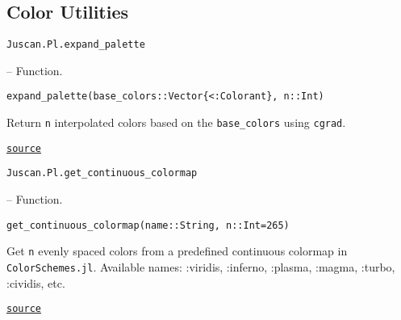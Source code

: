 \documentclass[oneside]{memoir}
\begin{document}
\subsection{Color Utilities}



\label{6696371495402316584}{}

\hypertarget{11638061159662821261}{\texttt{Juscan.Pl.expand\_palette}}  -- {Function.}

\begin{adjustwidth}{2em}{0pt}


\begin{verbatim}
expand_palette(base_colors::Vector{<:Colorant}, n::Int)
\end{verbatim}

Return \texttt{n} interpolated colors based on the \texttt{base\_colors} using \texttt{cgrad}.



\href{https://github.com/zehua0417/Juscan.jl/blob/393ad1b827b678ea98a738f92af658ee9ed9a403/src/plots/plots.jl#L8-L12}{\texttt{source}}


\end{adjustwidth}
\hypertarget{1933808085395326224}{\texttt{Juscan.Pl.get\_continuous\_colormap}}  -- {Function.}

\begin{adjustwidth}{2em}{0pt}


\begin{verbatim}
get_continuous_colormap(name::String, n::Int=265)
\end{verbatim}

Get \texttt{n} evenly spaced colors from a predefined continuous colormap in \texttt{ColorSchemes.jl}. Available names: :viridis, :inferno, :plasma, :magma, :turbo, :cividis, etc.



\href{https://github.com/zehua0417/Juscan.jl/blob/393ad1b827b678ea98a738f92af658ee9ed9a403/src/plots/plots.jl#L65-L70}{\texttt{source}}


\end{adjustwidth}
\end{document}
